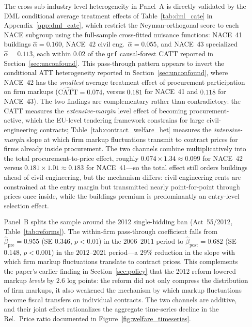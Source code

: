\documentclass[11pt]{article}
\begin{document}
The cross-sub-industry level heterogeneity in Panel~A is directly validated by the DML conditional average treatment effects of Table~\ref{tab:dml_cate} in Appendix~\ref{app:dml_cate}, which restrict the Neyman-orthogonal score to each NACE subgroup using the full-sample cross-fitted nuisance functions: NACE~41 buildings $\hat\alpha = 0.160$, NACE~42 civil eng.\ $\hat\alpha = 0.055$, and NACE~43 specialized $\hat\alpha = 0.113$, each within $0.02$ of the \texttt{grf} causal-forest CATT reported in Section~\ref{sec:unconfound}. This pass-through pattern appears to invert the conditional ATT heterogeneity reported in Section~\ref{sec:unconfound}, where NACE~42 has the \emph{smallest} average treatment effect of procurement participation on firm markups ($\widehat{\text{CATT}} = 0.074$, versus $0.181$ for NACE~41 and $0.118$ for NACE~43). The two findings are complementary rather than contradictory: the CATT measures the \emph{extensive-margin} level effect of becoming procurement-active, which the EU-level tendering framework constrains for large civil-engineering contracts; Table~\ref{tab:contract_welfare_het} measures the \emph{intensive-margin} slope at which firm markup fluctuations transmit to contract prices for firms already inside procurement. The two channels combine multiplicatively into the total procurement-to-price effect, roughly $0.074 \times 1.34 \approx 0.099$ for NACE~42 versus $0.181 \times 1.01 \approx 0.183$ for NACE~41---so the total effect still orders buildings ahead of civil engineering, but the mechanism differs: civil-engineering rents are constrained at the entry margin but transmitted nearly point-for-point through prices once inside, while the buildings premium is predominantly an entry-level selection effect.



Panel~B splits the sample around the 2012 single-bidding ban (Act~55/2012, Table~\ref{tab:reforms}). The within-firm pass-through coefficient falls from $\hat\beta_{\text{pre}} = 0.955$ (SE $0.346$, $p < 0.01$) in the $2006$--$2011$ period to $\hat\beta_{\text{post}} = 0.682$ (SE $0.148$, $p < 0.001$) in the $2012$--$2021$ period---a $29\%$ reduction in the slope with which firm markup fluctuations translate to contract prices. This complements the paper's earlier finding in Section~\ref{sec:policy} that the 2012 reform lowered markup \emph{levels} by $2.6$ log points: the reform did not only compress the distribution of firm markups, it also weakened the mechanism by which markup fluctuations become fiscal transfers on individual contracts. The two channels are additive, and their joint effect rationalizes the aggregate time-series decline in the Rel.\ Price ratio documented in Figure~\ref{fig:welfare_timeseries}.
\end{document}
